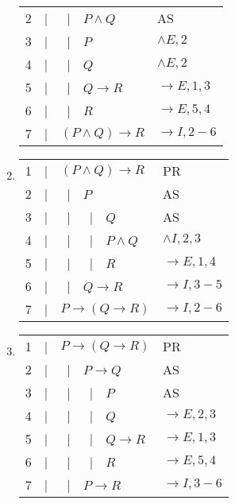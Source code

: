 \documentclass{article}
\newcommand{\asbar}{\ |\ \ }
\begin{document}
\begin{enumerate}
\begin{tabular}{llp{5cm}l}
              2 & | & \asbar \underline{$P \land Q$} & AS            \\
              3 & | & \asbar $P$                     & $\land E, 2$  \\
              4 & | & \asbar $Q$                     & $\land E, 2$  \\
              5 & | & \asbar $Q \to R$               & $\to E, 1, 3$ \\
              6 & | & \asbar $R$                     & $\to E, 5, 4$ \\
              7 & | & $(P \land Q) \to R$            & $\to I, 2-6$  \\
              \hline
          \end{tabular}
    \item \begin{tabular}{llp{5cm}l}
              1 & | & \underline{$(P \land Q) \to R$} & PR              \\
              2 & | & \asbar $P$                      & AS              \\
              3 & | & \asbar\asbar $Q$                & AS              \\
              4 & | & \asbar\asbar $P \land Q$        & $\land I, 2, 3$ \\
              5 & | & \asbar\asbar $R$                & $\to E, 1, 4$   \\
              6 & | & \asbar $Q \to R$                & $\to I, 3-5$    \\
              7 & | & $P \to (Q \to R)$               & $\to I, 2-6$    \\
              \hline
          \end{tabular}
    \item \begin{tabular}{llp{5cm}l}
              1 & | & \underline{$P \to (Q \to R)$} & PR            \\
              2 & | & \asbar $P \to Q$              & AS            \\
              3 & | & \asbar\asbar $P$              & AS            \\
              4 & | & \asbar\asbar $Q$              & $\to E, 2, 3$ \\
              5 & | & \asbar\asbar $Q \to R$        & $\to E, 1, 3$ \\
              6 & | & \asbar\asbar $R$              & $\to E, 5, 4$ \\
              7 & | & \asbar $P \to R$              & $\to I, 3-6$  \\

\end{tabular}
\end{enumerate}
\end{document}
